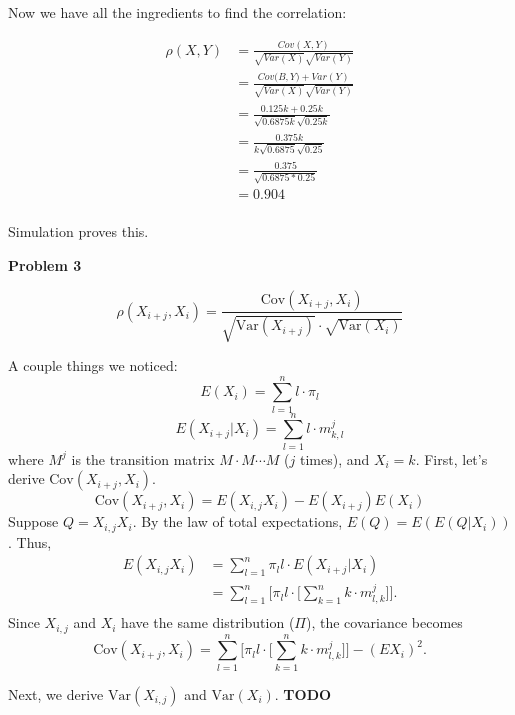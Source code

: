 \documentclass[12pt]{article}
\begin{document}
Now we have all the ingredients to find the correlation:


\begin{equation*}
	\begin{aligned}
	\rho(X,Y) &= \frac{Cov(X, Y)}{\sqrt{Var(X)}\sqrt{Var(Y)}} \\
	       &= \frac{Cov\big(B,Y\big) + Var(Y)}{\sqrt{Var(X)}\sqrt{Var(Y)}} \\
	       &= \frac{0.125k + 0.25k}{\sqrt{0.6875k}\sqrt{0.25k}} \\
	       &= \frac{0.375k}{k\sqrt{0.6875}\sqrt{0.25}} \\
	       &= \frac{0.375}{\sqrt{0.6875*0.25}} \\
	       &= 0.904\\
	\end{aligned}
\end{equation*}

Simulation proves this. 

\pagebreak
\textbf{Problem 3} 

$$\rho(X_{i+j}, X_i) = \frac{\text{Cov}(X_{i+j}, X_i)}
                 {\sqrt{\text{Var}(X_{i+j})} \cdot \sqrt{\text{Var}(X_i)}} $$ 

A couple things we noticed: 
$$ E(X_i) = \sum_{l=1}^n{l\cdot\pi_l} $$ 
$$ E(X_{i+j} | X_i) = \sum_{l=1}^n{l \cdot m^j_{k,l}} $$
where $M^j$ is the transition matrix $M \cdot M \cdots M$ ($j$ times), and 
$X_i = k$. First, let's derive $\text{Cov}(X_{i+j}, X_i)$. 
$$ \text{Cov}(X_{i+j}, X_i) = E(X_{i,j}X_i) - E(X_{i+j})E(X_i) $$
Suppose $Q = X_{i,j}X_i$. By the law of total expectations, $ E(Q) = E(E(Q|X_i))$.
Thus, 
\begin{equation*}
  \begin{aligned}
    E(X_{i,j}X_i) &= \sum_{l=1}^n{ \pi_l l \cdot E(X_{i+j} | X_i)} \\
                  &= \sum_{l=1}^n{ \Bigg[ \pi_l l \cdot \Big[ 
                         \sum_{k=1}^n{k \cdot m^j_{l,k}} \Big]} \Bigg]. \\
  \end{aligned}
\end{equation*}
Since $X_{i,j}$ and $X_i$ have the same distribution ($\Pi$), the covariance becomes
$$ \text{Cov}(X_{i+j}, X_i) =  \sum_{l=1}^n{ \Bigg[ \pi_l l \cdot \Big[ 
                                     \sum_{k=1}^n{k \cdot m^j_{l,k}} \Big]} \Bigg]
                              - (EX_i)^2.$$

Next, we derive $\text{Var}(X_{i,j})$ and $\text{Var}(X_i)$. \textbf{TODO}
\end{document}
